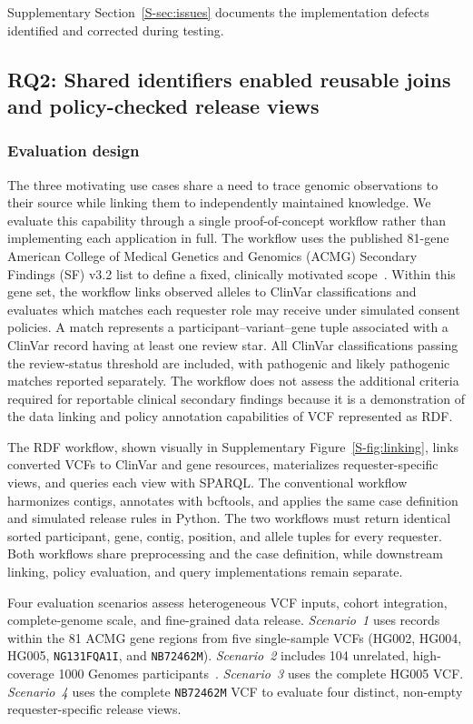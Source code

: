 \documentclass[pdflatex,sn-mathphys-num,referee]{sn-jnl}
\begin{document}
Supplementary Section~\ref{S-sec:issues} documents the implementation defects identified and corrected during testing.

\subsection{RQ2: Shared identifiers enabled reusable joins and policy-checked release views}\label{subsec:results-workflow}
\subsubsection{Evaluation design}\label{subsec:eval-workflow}
The three motivating use cases share a need to trace genomic observations to their source while linking them to independently maintained knowledge.
We evaluate this capability through a single proof-of-concept workflow rather than implementing each application in full.
The workflow uses the published 81-gene American College of Medical Genetics and Genomics (ACMG) Secondary Findings (SF) v3.2 list to define a fixed, clinically motivated scope~\cite{miller2023acmg}.
Within this gene set, the workflow links observed alleles to ClinVar classifications and evaluates which matches each requester role may receive under simulated consent policies.
A match represents a participant--variant--gene tuple associated with a ClinVar record having at least one review star.
All ClinVar classifications passing the review-status threshold are included, with pathogenic and likely pathogenic matches reported separately.
The workflow does not assess the additional criteria required for reportable clinical secondary findings because it is a demonstration of the data linking and policy annotation capabilities of VCF represented as RDF.

The RDF workflow, shown visually in Supplementary Figure~\ref{S-fig:linking}, links converted VCFs to ClinVar and gene resources, materializes requester-specific views, and queries each view with SPARQL.
The conventional workflow harmonizes contigs, annotates with bcftools, and applies the same case definition and simulated release rules in Python.
The two workflows must return identical sorted participant, gene, contig, position, and allele tuples for every requester.
Both workflows share preprocessing and the case definition, while downstream linking, policy evaluation, and query implementations remain separate.

Four evaluation scenarios assess heterogeneous VCF inputs, cohort integration, complete-genome scale, and fine-grained data release.
\emph{Scenario~1} uses records within the 81 ACMG gene regions from five single-sample VCFs (HG002, HG004, HG005, \texttt{NG131FQA1I}, and \texttt{NB72462M}).
\emph{Scenario~2} includes 104 unrelated, high-coverage 1000 Genomes participants~\cite{byrska2022highcoverage}.
\emph{Scenario~3} uses the complete HG005 VCF.
\emph{Scenario~4} uses the complete \texttt{NB72462M} VCF to evaluate four distinct, non-empty requester-specific release views.
\end{document}
